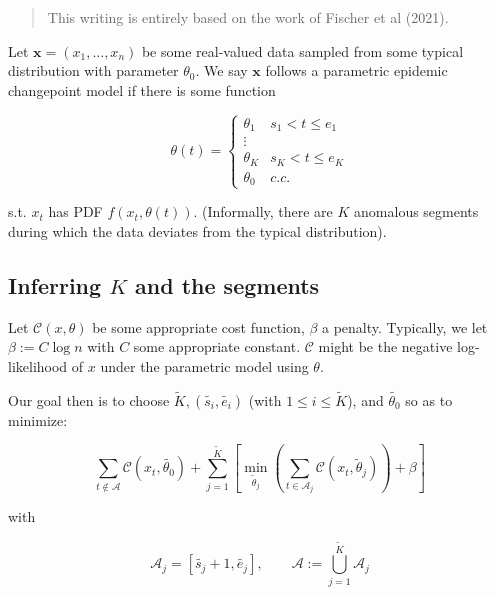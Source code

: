 \documentclass[a4paper, 12pt]{article}
\begin{document}
\begin{quote}
    This writing is entirely based on the work of Fischer et al (2021).
\end{quote}

Let $\textbf{x} = (x_1, \ldots, x_n)$ be some real-valued data sampled from some
typical distribution with parameter $\theta_0$. We say $\textbf{x}$ follows a
parametric epidemic changepoint model if there is some function 

\begin{equation*}
    \theta(t) = \begin{cases}
        \theta_1 & s_1 < t \leq e_1 \\ 
        \vdots \\ 
        \theta_K & s_K < t \leq e_K \\ 
        \theta_0 & c.c.
    \end{cases}
\end{equation*}

s.t. $x_t$ has PDF $f(x_t, \theta(t))$. (Informally, there are $K$ anomalous
segments during which the data deviates from the typical distribution).

\subsection{Inferring $K$ and the segments}

Let $\mathcal{C}(x, \theta)$ be some appropriate cost function, $\beta$ a
penalty. Typically, we let $\beta := C \log n$ with $C$ some appropriate
constant. $\mathcal{C}$ might be the negative log-likelihood of $x$ under the
parametric model using $\theta$. 

Our goal then is to choose $\widetilde{ K }, (\widetilde{ s_i },
\widetilde{ e_i }  ) $ (with $1 \leq i \leq \widetilde{ K } $), and $\widetilde{
\theta_0} $ so as to minimize: 

\begin{equation}
    \sum_{t \not\in \mathcal{A}} \mathcal{C}(x_t, \widetilde{ \theta_0 } ) +
    \sum_{j=1}^{\widetilde{ K } } \left[ \min_{\widetilde{ \theta }_j } \left(
    \sum_{t \in \mathcal{A}_j} \mathcal{C}(x_t,
\widetilde{ \theta }_j ) \right) + \beta \right] 
\end{equation}

with 

\begin{equation*}
\mathcal{A}_j= [\widetilde{ s_j } + 1, \widetilde{ e_j }], \qquad \mathcal{A} :=
\bigcup_{j=1}^{ \widetilde{ K } } \mathcal{A}_j
\end{equation*}
\end{document}
